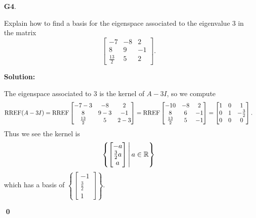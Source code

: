 \documentclass{article}
\newenvironment{problem}[1]
{
  \begin{flushleft}
  \textbf{#1}.
  \ignorespaces
}
{
  \end{flushleft}
}
\newenvironment{solution}
{
  \ignorespaces
  \textbf{Solution:}
}
{
  \ignorespacesafterend
  \begin{flushright}
  {\bfseries \qed}
  \end{flushright}
}
\begin{document}
\begin{problem}{G4}
Explain how to find a basis for the eigenspace associated to the eigenvalue $3$ in the matrix \[\begin{bmatrix} -7 & -8 & 2 \\ 8 & 9 & -1 \\ \frac{13}{2} & 5 & 2 \end{bmatrix}.\]
\end{problem}
\begin{solution}
The eigenspace associated to $3$ is the kernel of $A-3I$, so we compute
\[\operatorname{RREF}(A-3I) = \operatorname{RREF} \begin{bmatrix} -7-3 & -8 & 2 \\ 8 & 9-3 & -1 \\ \frac{13}{2} & 5 & 2-3 \end{bmatrix} = \operatorname{RREF} \begin{bmatrix} -10 & -8 & 2 \\ 8 & 6 & -1 \\ \frac{13}{2} & 5 & -1 \end{bmatrix} = \begin{bmatrix} 1 & 0 & 1 \\ 0 & 1 & -\frac{3}{2} \\ 0 & 0 & 0 \end{bmatrix}.\]
Thus we see the kernel is \[\left\{\begin{bmatrix} -a \\ \frac{3}{2} a \\ a \end{bmatrix}\,\middle|\,a \in \mathbb{R}\right\}\]
which has a basis of \(\left\{ \begin{bmatrix} -1 \\ \frac{3}{2} \\ 1 \end{bmatrix} \right\}\).
\end{solution}
\end{document}
